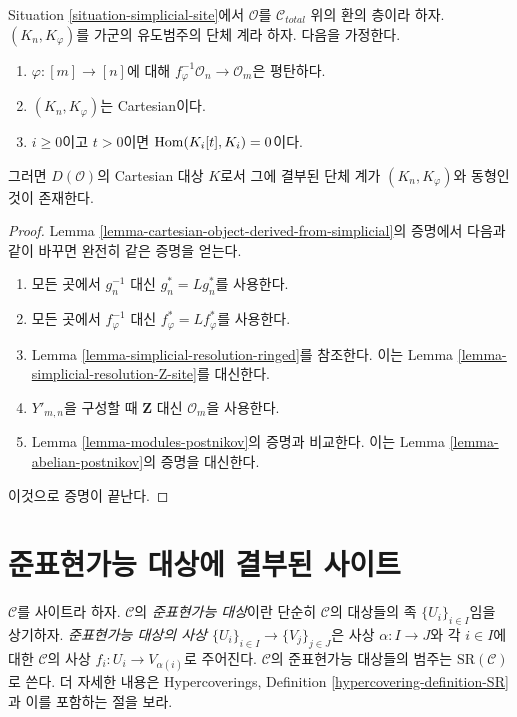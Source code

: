 \begin{lemma}
\label{lemma-cartesian-module-derived-from-simplicial}
Situation \ref{situation-simplicial-site}에서
$\mathcal{O}$를 $\mathcal{C}_{total}$ 위의 환의 층이라 하자.
$(K_n, K_\varphi)$를 가군의 유도범주의 단체 계라 하자.
다음을 가정한다.
\begin{enumerate}
\item $\varphi : [m] \to [n]$에 대해
$f_\varphi^{-1}\mathcal{O}_n \to \mathcal{O}_m$은 평탄하다.
\item $(K_n, K_\varphi)$는 Cartesian이다.
\item $i \geq 0$이고 $t > 0$이면
$\mathop{\mathrm{Hom}}\nolimits(K_i[t], K_i) = 0$이다.
\end{enumerate}
그러면 $D(\mathcal{O})$의 Cartesian 대상 $K$로서
그에 결부된 단체 계가 $(K_n, K_\varphi)$와 동형인 것이 존재한다.
\end{lemma}

\begin{proof}
Lemma \ref{lemma-cartesian-object-derived-from-simplicial}의 증명에서
다음과 같이 바꾸면 완전히 같은 증명을 얻는다.
\begin{enumerate}
\item 모든 곳에서 $g_n^{-1}$ 대신 $g_n^* = Lg_n^*$를 사용한다.
\item 모든 곳에서 $f_\varphi^{-1}$ 대신
$f_\varphi^* = Lf_\varphi^*$를 사용한다.
\item Lemma \ref{lemma-simplicial-resolution-ringed}를 참조한다.
이는 Lemma \ref{lemma-simplicial-resolution-Z-site}를 대신한다.
\item $Y'_{m, n}$을 구성할 때 $\mathbf{Z}$ 대신
$\mathcal{O}_m$을 사용한다.
\item Lemma \ref{lemma-modules-postnikov}의 증명과 비교한다.
이는 Lemma \ref{lemma-abelian-postnikov}의 증명을 대신한다.
\end{enumerate}
이것으로 증명이 끝난다.
\end{proof}


\section{준표현가능 대상에 결부된 사이트}
\label{section-semi-representable}

\noindent
$\mathcal{C}$를 사이트라 하자. $\mathcal{C}$의
{\it 준표현가능 대상}이란 단순히 $\mathcal{C}$의 대상들의 족
$\{U_i\}_{i \in I}$임을 상기하자.
{\it 준표현가능 대상의 사상
$\{U_i\}_{i \in I} \to \{V_j\}_{j \in J}$}은 사상
$\alpha : I \to J$와 각 $i \in I$에 대한 $\mathcal{C}$의 사상
$f_i : U_i \to V_{\alpha(i)}$로 주어진다.
$\mathcal{C}$의 준표현가능 대상들의 범주는
$\text{SR}(\mathcal{C})$로 쓴다.
더 자세한 내용은 Hypercoverings, Definition
\ref{hypercovering-definition-SR}과 이를 포함하는 절을 보라.

